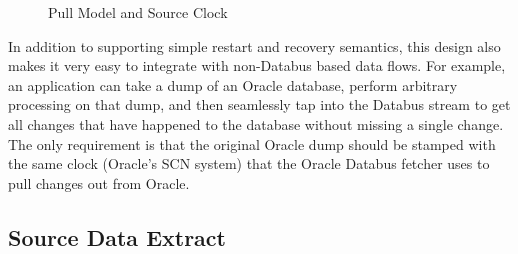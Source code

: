\begin{figure}
\centering
{}
\caption{Pull Model and Source Clock}
\label{fig:pull-model}
\end{figure}

In addition to supporting simple restart and recovery semantics, this design also makes it very easy to integrate with non-Databus based data flows. 
For example, an application can take a dump of an Oracle database, perform arbitrary processing on that dump, and then seamlessly tap into the Databus stream to get all changes that have happened to the database without missing a single change. The only requirement is that the original Oracle dump should be stamped with the same clock (Oracle's SCN system) that the Oracle Databus fetcher uses to pull changes out from Oracle. 

\subsection{Source Data Extract}

